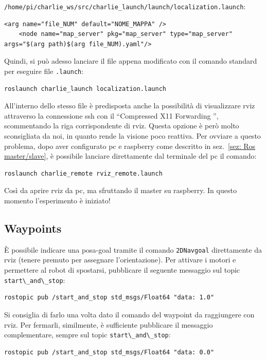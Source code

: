 \verb|/home/pi/charlie_ws/src/charlie_launch/launch/localization.launch|:

\begin{lstlisting}[style=xml, firstnumber=14]
	<arg name="file_NUM" default="NOME_MAPPA" />
	<node name="map_server" pkg="map_server" type="map_server" args="$(arg path)$(arg file_NUM).yaml"/>
\end{lstlisting}

Quindi, si può adesso lanciare il file appena modificato con il comando standard per eseguire file \verb|.launch|:
\begin{lstlisting}[style=bash]
	roslaunch charlie_launch localization.launch
\end{lstlisting}

All'interno dello stesso file è predisposta anche la possibilità di visualizzare rviz attraverso la connessione ssh con il ``Compressed X11 Forwarding '', scommentando la riga corrispondente di rviz. Questa opzione è però molto sconsigliata da noi, in quanto rende la visione poco reattiva. Per ovviare a questo problema, dopo aver configurato pc e raspberry come descritto in sez.~\ref{sez: Ros master/slave}, è possibile lanciare direttamente dal terminale del pc il comando:

\begin{lstlisting}[style=bashPC]
	roslaunch charlie_remote rviz_remote.launch
\end{lstlisting}
Così da aprire rviz da pc, ma sfruttando il master su raspberry.
In questo momento l'esperimento è iniziato!

\subsection*{Waypoints}
\`E possibile indicare una posa-goal tramite il comando \texttt{2DNavgoal} direttamente da rviz (tenere premuto per assegnare l'orientazione).
Per attivare i motori e permettere al robot di spostarsi, pubblicare il seguente messaggio sul topic \verb|start\_and\_stop|:

\begin{lstlisting}[style=bash]
	rostopic pub /start_and_stop std_msgs/Float64 "data: 1.0"
\end{lstlisting}
Si consiglia di farlo una volta dato il comando del waypoint da raggiungere con rviz.
Per fermarli, similmente, è sufficiente pubblicare il messaggio complementare, sempre sul topic \verb|start\_and\_stop|:

\begin{lstlisting}[style=bash]
	rostopic pub /start_and_stop std_msgs/Float64 "data: 0.0"
\end{lstlisting}

